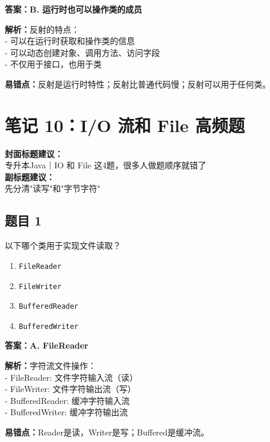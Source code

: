 \documentclass[12pt,a4paper]{ctexart}
\begin{document}
\begin{answerbox}
	\textbf{答案：B. 运行时也可以操作类的成员}

	\textbf{解析：}反射的特点：\\
	- 可以在运行时获取和操作类的信息\\
	- 可以动态创建对象、调用方法、访问字段\\
	- 不仅用于接口，也用于类

	\textbf{易错点：}反射是运行时特性；反射比普通代码慢；反射可以用于任何类。
\end{answerbox}

\newpage

\section{笔记 10：I/O 流和 File 高频题}
\begin{coverbox}
	\textbf{封面标题建议：}\\
	专升本Java｜IO 和 File 这4题，很多人做题顺序就错了\\
	\textbf{副标题建议：}\\
	先分清"读写"和"字节字符"
\end{coverbox}

\subsection*{题目 1}
以下哪个类用于实现文件读取？
\begin{enumerate}[label=\Alph*.]
	\item \texttt{FileReader}
	\item \texttt{FileWriter}
	\item \texttt{BufferedReader}
	\item \texttt{BufferedWriter}
\end{enumerate}

\begin{answerbox}
	\textbf{答案：A. FileReader}

	\textbf{解析：}字符流文件操作：\\
	- FileReader: 文件字符输入流（读）\\
	- FileWriter: 文件字符输出流（写）\\
	- BufferedReader: 缓冲字符输入流\\
	- BufferedWriter: 缓冲字符输出流

	\textbf{易错点：}Reader是读，Writer是写；Buffered是缓冲流。
\end{answerbox}
\end{document}
